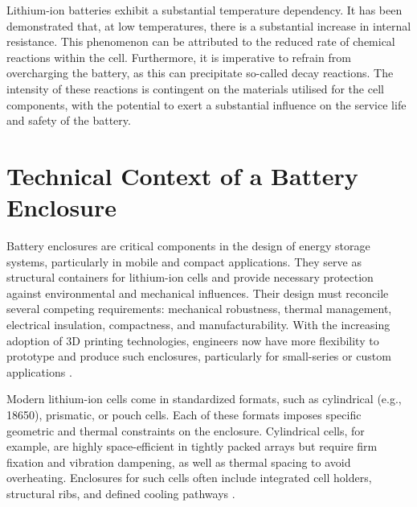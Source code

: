Lithium-ion batteries exhibit a substantial temperature dependency. It has been demonstrated that, at low temperatures, there is a substantial increase in internal resistance. This phenomenon can be attributed to the reduced rate of chemical reactions within the cell. Furthermore, it is imperative to refrain from overcharging the battery, as this can precipitate so-called decay reactions. The intensity of these reactions is contingent on the materials utilised for the cell components, with the potential to exert a substantial influence on the service life and safety of the battery.\autocite[S. 15f.]{Korthauer.2013}


\section{Technical Context of a Battery Enclosure}
Battery enclosures are critical components in the design of energy storage systems, particularly in mobile and compact applications. They serve as structural containers for lithium-ion cells and provide necessary protection against environmental and mechanical influences. Their design must reconcile several competing requirements: mechanical robustness, thermal management, electrical insulation, compactness, and manufacturability. With the increasing adoption of 3D printing technologies, engineers now have more flexibility to prototype and produce such enclosures, particularly for small-series or custom applications \cite{gebhardt2016}.

Modern lithium-ion cells come in standardized formats, such as cylindrical (e.g., 18650), prismatic, or pouch cells. Each of these formats imposes specific geometric and thermal constraints on the enclosure. Cylindrical cells, for example, are highly space-efficient in tightly packed arrays but require firm fixation and vibration dampening, as well as thermal spacing to avoid overheating. Enclosures for such cells often include integrated cell holders, structural ribs, and defined cooling pathways \cite{pistoia2018}. 

